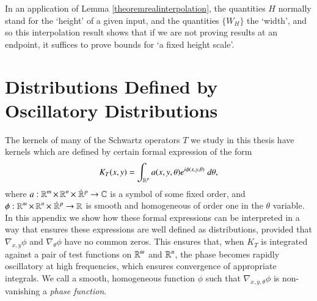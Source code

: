 In an application of Lemma \ref{theoremrealinterpolation}, the quantities $H$ normally stand for the `height' of a given input, and the quantities $\{ W_H \}$ the `width', and so this interpolation result shows that if we are not proving results at an endpoint, it suffices to prove bounds for `a fixed height scale'.









\renewcommand{\thechapter}{B}
\chapter{Distributions Defined by Oscillatory Distributions} \label{cha:distributions_defined_by_oscillatory_distributions}

The kernels of many of the Schwartz operators $T$ we study in this thesis have kernels which are defined by certain formal expression of the form
%
\begin{equation}
    K_T(x,y) = \int_{\operatorname{\mathbb{R}}^p} a(x,y,\theta) e^{i \phi(x,y,\theta)}\; d\theta,
\end{equation}
%
where $a: \RR^m \times \RR^n \times\; \dot{\RR}{\vphantom{\RR}}^p \to \CC$ is a symbol of some fixed order, and $\phi: \RR^m \times \RR^n \times\; \dot{\RR}{\vphantom{\RR}}^p \to \RR$ is smooth and homogeneous of order one in the $\theta$ variable. In this appendix we show how these formal expressions can be interpreted in a way that ensures these expressions are well defined as distributions, provided that $\nabla_{x,y} \phi$ and $\nabla_\theta \phi$ have no common zeros. This ensures that, when $K_T$ is integrated against a pair of test functions on $\operatorname{\mathbb{R}}^m$ and $\operatorname{\mathbb{R}}^n$, the phase becomes rapidly oscillatory at high frequencies, which ensures convergence of appropriate integrals. We call a smooth, homogeneous function $\phi$ such that $\nabla_{x,y,\theta} \phi$ is non-vanishing a \emph{phase function}.

